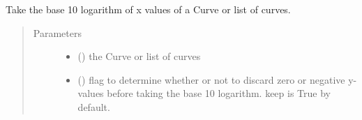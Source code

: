\documentclass[letterpaper,10pt,english]{sphinxmanual}
\begin{document}

\begin{fulllineitems}
\label{\detokenize{pydv:pydvpy.log10x}}
Take the base 10 logarithm of x values of a Curve or list of curves.

\begin{sphinxVerbatim}[commandchars=\\\{\}]
  
\end{sphinxVerbatim}

\begin{sphinxVerbatim}[commandchars=\\\{\}]
 
\end{sphinxVerbatim}

\begin{sphinxVerbatim}[commandchars=\\\{\}]
\PYG{p}{[}\PYG{p}{]}
\end{sphinxVerbatim}
\begin{quote}\begin{description}
\item[{Parameters}] \leavevmode\begin{itemize}
\item {} 
 ({\hyperref[\detokenize{pydv:curve.Curve}]{}}) \textendash{} the Curve or list of curves

\item {} 
 (\sphinxstyleliteralemphasis{\sphinxupquote{, }}) \textendash{} flag to determine whether or not to discard zero or negative y-values before taking the base 10 logarithm.
keep is True by default.

\end{itemize}

\end{description}\end{quote}

\end{fulllineitems}
\end{document}
